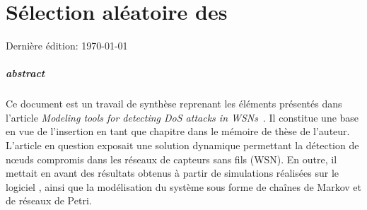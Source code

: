 \chapter{Sélection aléatoire des \cns}
\minitoc

\renewcommand\chapterpath{Main/SelecAleatoire}
\renewcommand\chapterfig{Main/SelecAleatoire/Figures}

Dernière édition: \today

\paragraph{abstract}
Ce document est un travail de synthèse reprenant les éléments présentés dans l'article \textit{Modeling tools for detecting DoS attacks in WSNs}~\cite{BMM13}.
Il constitue une base en vue de l'insertion en tant que chapitre dans le mémoire de thèse de l'auteur.\\

L'article en question exposait une solution dynamique permettant la détection de nœuds compromis dans les réseaux de capteurs sans fils (WSN).
En outre, il mettait en avant des résultats obtenus à partir de simulations réalisées sur le logiciel \ns, ainsi que la modélisation du système sous forme de chaînes de Markov et de réseaux de Petri.\\

